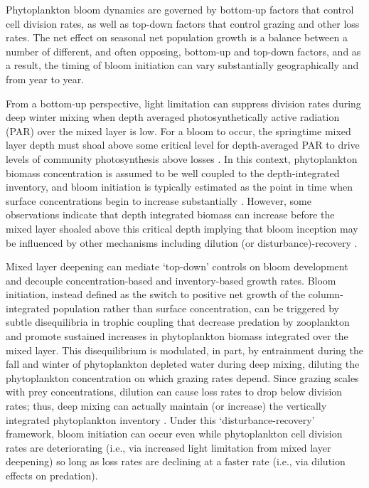 Phytoplankton bloom dynamics are governed by bottom-up factors that control cell division rates, as well as top-down factors that control grazing and other loss rates. The net effect on seasonal net population growth is a balance between a number of different, and often opposing, bottom-up and top-down factors, and as a result, the timing of bloom initiation can vary substantially geographically and from year to year. 

From a bottom-up perspective, light limitation can suppress division rates during deep winter mixing when depth averaged photosynthetically active radiation (PAR) over the mixed layer is low. For a bloom to occur, the springtime mixed layer depth must shoal above some critical level for depth-averaged PAR to drive levels of community photosynthesis above losses \parencite{GranQuantitativeStudyPhytoplankton1935, RileyFactorsControllingPhytoplankton1946, SverdrupConditionsVernalBlooming1953}. In this context, phytoplankton biomass concentration is assumed to be well coupled to the depth-integrated inventory, and bloom initiation is typically estimated as the point in time when surface concentrations begin to increase substantially \parencite{SiegelNorthAtlanticSpring2002}. However, some observations indicate that depth integrated biomass can increase before the mixed layer shoaled above this critical depth \parencite{TownsendSpringphytoplanktonblooms1992, EllertsenSpringbloomsstratification1993, DaleSeasonaldevelopmentphytoplankton1999} implying that bloom inception may be influenced by other mechanisms including dilution (or disturbance)-recovery \parencite{FischerSixtyYearsSverdrup2014}. 

Mixed layer deepening can mediate `top-down' controls on bloom development \parencite{BehrenfeldAbandoningSverdrupCritical2010,BehrenfeldAnnualcyclesecological2013} and decouple concentration-based and inventory-based growth rates. Bloom initiation, instead defined as the switch to positive net growth of the column-integrated population rather than surface concentration, can be triggered by subtle disequilibria in trophic coupling that decrease predation by zooplankton and promote sustained increases in phytoplankton biomass integrated over the mixed layer. This disequilibrium is modulated, in part, by entrainment during the fall and winter of phytoplankton depleted water during deep mixing, diluting the phytoplankton concentration on which grazing rates depend. Since grazing scales with prey concentrations, dilution can cause loss rates to drop below division rates; thus, deep mixing can actually maintain (or increase) the vertically integrated phytoplankton inventory \parencite{BehrenfeldAbandoningSverdrupCritical2010,BehrenfeldAnnualcyclesecological2013}. Under this `disturbance-recovery' framework, bloom initiation can occur even while phytoplankton cell division rates are deteriorating (i.e., via increased light limitation from mixed layer deepening) so long as loss rates are declining at a faster rate (i.e., via dilution effects on predation).


